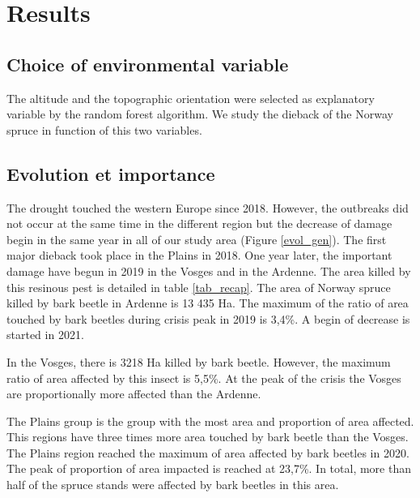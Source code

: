 \documentclass[3p,procedia]{elsarticle}
\begin{document}
	






\section{Results}

\subsection{Choice of environmental variable}
The altitude and the topographic orientation were selected as explanatory variable by the random forest algorithm.
We study the dieback of the Norway spruce in function of this two variables.



\subsection{Evolution et importance}

The drought touched the western Europe since 2018.
However, the outbreaks did not occur at the same time in the different region but the decrease of damage begin in the same year in all of our study area (Figure \ref{evol_gen}).
The first major dieback took place in the Plains in 2018.
One year later, the important damage have begun in 2019 in the Vosges and in the Ardenne.  
The area killed by this resinous pest is detailed in table \ref{tab_recap}.
The area of Norway spruce killed by bark beetle in Ardenne is 13 435 Ha.
The maximum of the ratio of area touched by bark beetles during crisis peak in 2019 is 3,4\%. 
A begin of decrease is started in 2021.

In the Vosges, there is 3218 Ha killed by bark beetle.
However, the maximum ratio of area affected by this insect is 5,5\%.
At the peak of the crisis the Vosges are proportionally more affected than the Ardenne.

The Plains group is the group with the most area and proportion of area affected.
This regions have three times more area touched by bark beetle than the Vosges.
The Plains region reached the maximum of area affected by bark beetles in 2020. 
The peak of proportion of area impacted is reached at 23,7\%.
In total, more than half of the spruce stands were affected by bark beetles in this area.
\end{document}
